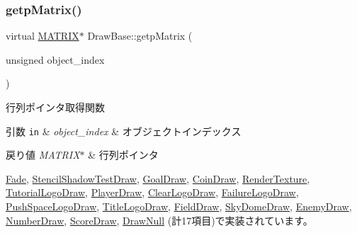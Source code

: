\mbox{\label{class_draw_base_a60fc3148b2679e4ea7723d2af0c37283}} 
\subsubsection{\texorpdfstring{getp\+Matrix()}{getpMatrix()}}
{\footnotesize\ttfamily virtual \mbox{\hyperlink{_vector3_d_8h_a032295cd9fb1b711757c90667278e744}{M\+A\+T\+R\+IX}}$\ast$ Draw\+Base\+::getp\+Matrix (\begin{DoxyParamCaption}\item[{unsigned}]{object\+\_\+index }\end{DoxyParamCaption})\hspace{0.3cm}{\ttfamily [pure virtual]}}



行列ポインタ取得関数 


\begin{DoxyParams}[1]{引数}
\mbox{\tt in}  & {\em object\+\_\+index} & オブジェクトインデックス \\
\hline
\end{DoxyParams}

\begin{DoxyRetVals}{戻り値}
{\em M\+A\+T\+R\+I\+X$\ast$} & 行列ポインタ \\
\hline
\end{DoxyRetVals}


\mbox{\hyperlink{class_fade_a2e41a31f9801476e63d2082804375e96}{Fade}}, \mbox{\hyperlink{class_stencil_shadow_test_draw_a8ab105b75d673adc52698a8401c6525c}{Stencil\+Shadow\+Test\+Draw}}, \mbox{\hyperlink{class_goal_draw_a536a23c043576f9032e6651d7644d038}{Goal\+Draw}}, \mbox{\hyperlink{class_coin_draw_ad8cbbe87f4cf4428214f50492c731f5f}{Coin\+Draw}}, \mbox{\hyperlink{class_render_texture_adafb7e9aeea3c298cbfcc71e35ed9457}{Render\+Texture}}, \mbox{\hyperlink{class_tutorial_logo_draw_aade531190180c385c266f5698f99735d}{Tutorial\+Logo\+Draw}}, \mbox{\hyperlink{class_player_draw_a334e94f368f6bd571da866d69333f313}{Player\+Draw}}, \mbox{\hyperlink{class_clear_logo_draw_abcbd0cd8663e0262bcdd83356516082b}{Clear\+Logo\+Draw}}, \mbox{\hyperlink{class_failure_logo_draw_a6e6fb80dc21af9318d659bc3fa71c0b5}{Failure\+Logo\+Draw}}, \mbox{\hyperlink{class_push_space_logo_draw_a9e0875967651293ef97713477334bc2e}{Push\+Space\+Logo\+Draw}}, \mbox{\hyperlink{class_title_logo_draw_a34fa4366f1ff190a08a36f8e402f6941}{Title\+Logo\+Draw}}, \mbox{\hyperlink{class_field_draw_ad399978201f737f4c0dd2b3990fa6b34}{Field\+Draw}}, \mbox{\hyperlink{class_sky_dome_draw_accbc05d1bbde9ad9d6b7180d91e9ed89}{Sky\+Dome\+Draw}}, \mbox{\hyperlink{class_enemy_draw_afbb8ac19041abda280ece7737103dc66}{Enemy\+Draw}}, \mbox{\hyperlink{class_number_draw_a2ea44b362c3a018faf46905d0f755410}{Number\+Draw}}, \mbox{\hyperlink{class_score_draw_adb995c83624c2eab8b8a15d1182df5b8}{Score\+Draw}}, \mbox{\hyperlink{class_draw_null_a9aac059eb3b5d1f77e8bd3aa0647cff9}{Draw\+Null}} (計17項目)で実装されています。

